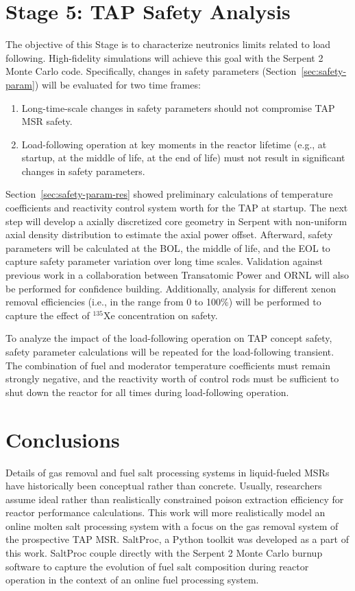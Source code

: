\section{Stage 5: \gls{TAP} Safety Analysis}
The objective of this Stage is to characterize neutronics limits related to 
load following. High-fidelity simulations will achieve this goal with the 
Serpent 2 Monte Carlo code. Specifically, changes in safety parameters 
(Section~\ref{sec:safety-param}) will be evaluated for two time frames:
\begin{enumerate}
	\item Long-time-scale changes in safety parameters should not compromise 
	\gls{TAP} \gls{MSR} safety.
	\item Load-following operation at key moments in the reactor lifetime 
	(e.g., at startup, at the middle of life, at the end of life) must not 
	result in significant changes in safety parameters.
\end{enumerate}
Section~\ref{sec:safety-param-res} showed preliminary calculations of  
temperature coefficients and reactivity control system worth for the \gls{TAP} 
at startup. The next step will develop a axially discretized core geometry in 
Serpent with non-uniform axial density distribution to estimate the axial 
power offset. Afterward, safety parameters will be calculated at the 
\gls{BOL}, the middle of life, and the \gls{EOL} to capture safety parameter  
variation over long time scales. Validation against previous work in a 
collaboration between Transatomic Power and ORNL 
\cite{betzler_assessment_2017, betzler_fuel_2018} will also be 
performed for confidence building. Additionally, analysis for different xenon 
removal efficiencies (i.e., in the range from 0 to 100\%) will be performed to 
capture the effect of $^{135}$Xe concentration on safety.

To analyze the impact of the load-following operation on \gls{TAP} concept 
safety, safety parameter calculations will be repeated for the load-following 
transient. The combination of fuel and moderator temperature coefficients must 
remain strongly negative, and the reactivity worth of control rods must be 
sufficient to shut down the reactor for all times during load-following 
operation. 

\section{Conclusions}
Details of gas removal and fuel salt processing systems in liquid-fueled 
\glspl{MSR} have historically been conceptual rather than concrete. Usually, 
researchers assume ideal rather than realistically constrained poison 
extraction efficiency for reactor performance calculations. This work will 
more realistically model an online molten salt processing system with a focus 
on the gas removal system of the prospective \gls{TAP} \gls{MSR}. SaltProc, a 
Python toolkit was developed as a part of this work. SaltProc couple directly 
with the Serpent 2 Monte Carlo burnup software to capture the evolution of 
fuel salt composition during reactor operation in the context of an online 
fuel processing system.

